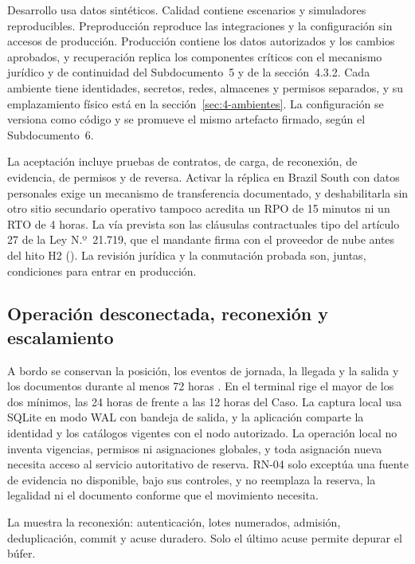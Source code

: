 Desarrollo usa datos sintéticos. Calidad contiene escenarios y simuladores reproducibles.
Preproducción reproduce las integraciones y la configuración sin accesos de producción. Producción
contiene los datos autorizados y los cambios aprobados, y recuperación replica los componentes críticos
con el mecanismo jurídico y de continuidad del Subdocumento~5 y de la sección~4.3.2. Cada ambiente tiene
identidades, secretos, redes, almacenes y permisos separados, y su emplazamiento físico está en la
sección~\ref{sec:4-ambientes}. La configuración se versiona como código y se promueve el mismo artefacto
firmado, según el Subdocumento~6.

La aceptación incluye pruebas de contratos, de carga, de reconexión, de evidencia, de permisos y de
reversa. Activar la réplica en Brazil South con datos personales exige un mecanismo de transferencia
documentado, y deshabilitarla sin otro sitio secundario operativo tampoco acredita un RPO de 15 minutos
ni un RTO de 4 horas. La vía prevista son las cláusulas contractuales tipo del artículo 27 de la Ley
N.º~21.719, que el mandante firma con el proveedor de nube antes del hito H2
(). La revisión jurídica y la conmutación probada son, juntas,
condiciones para entrar en producción.

\subsection{Operación desconectada, reconexión y escalamiento}\label{sec:4-desconectada}

A bordo se conservan la posición, los eventos de jornada, la llegada y la salida y los documentos
durante al menos 72 horas . En el terminal rige el mayor de los dos mínimos, las 24
horas de  frente a las 12 horas del Caso. La captura local usa SQLite en modo WAL
con bandeja de salida, y la aplicación comparte la identidad y los catálogos vigentes con el nodo
autorizado. La operación local no inventa vigencias, permisos ni asignaciones globales, y toda
asignación nueva necesita acceso al servicio autoritativo de reserva. RN-04 solo exceptúa una fuente de
evidencia no disponible, bajo sus controles, y no reemplaza la reserva, la legalidad ni el documento
conforme que el movimiento necesita.

La  muestra la reconexión: autenticación, lotes numerados, admisión,
deduplicación, commit y acuse duradero. Solo el último acuse permite depurar el búfer.

